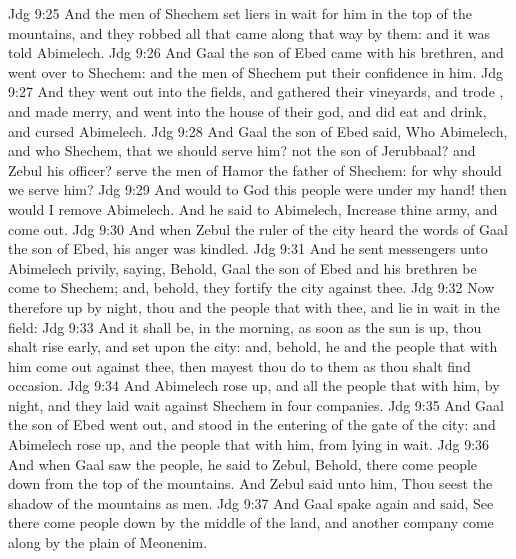 \vs Jdg 9:25 And the men of Shechem set liers in wait for him in the top of the mountains, and they robbed all that came along that way by them: and it was told Abimelech.
\vs Jdg 9:26 And Gaal the son of Ebed came with his brethren, and went over to Shechem: and the men of Shechem put their confidence in him.
\vs Jdg 9:27 And they went out into the fields, and gathered their vineyards, and trode , and made merry, and went into the house of their god, and did eat and drink, and cursed Abimelech.
\vs Jdg 9:28 And Gaal the son of Ebed said, Who  Abimelech, and who  Shechem, that we should serve him?  not  the son of Jerubbaal? and Zebul his officer? serve the men of Hamor the father of Shechem: for why should we serve him?
\vs Jdg 9:29 And would to God this people were under my hand! then would I remove Abimelech. And he said to Abimelech, Increase thine army, and come out.
\vs Jdg 9:30 And when Zebul the ruler of the city heard the words of Gaal the son of Ebed, his anger was kindled.
\vs Jdg 9:31 And he sent messengers unto Abimelech privily, saying, Behold, Gaal the son of Ebed and his brethren be come to Shechem; and, behold, they fortify the city against thee.
\vs Jdg 9:32 Now therefore up by night, thou and the people that  with thee, and lie in wait in the field:
\vs Jdg 9:33 And it shall be,  in the morning, as soon as the sun is up, thou shalt rise early, and set upon the city: and, behold,  he and the people that  with him come out against thee, then mayest thou do to them as thou shalt find occasion.
\vs Jdg 9:34 And Abimelech rose up, and all the people that  with him, by night, and they laid wait against Shechem in four companies.
\vs Jdg 9:35 And Gaal the son of Ebed went out, and stood in the entering of the gate of the city: and Abimelech rose up, and the people that  with him, from lying in wait.
\vs Jdg 9:36 And when Gaal saw the people, he said to Zebul, Behold, there come people down from the top of the mountains. And Zebul said unto him, Thou seest the shadow of the mountains as  men.
\vs Jdg 9:37 And Gaal spake again and said, See there come people down by the middle of the land, and another company come along by the plain of Meonenim.

